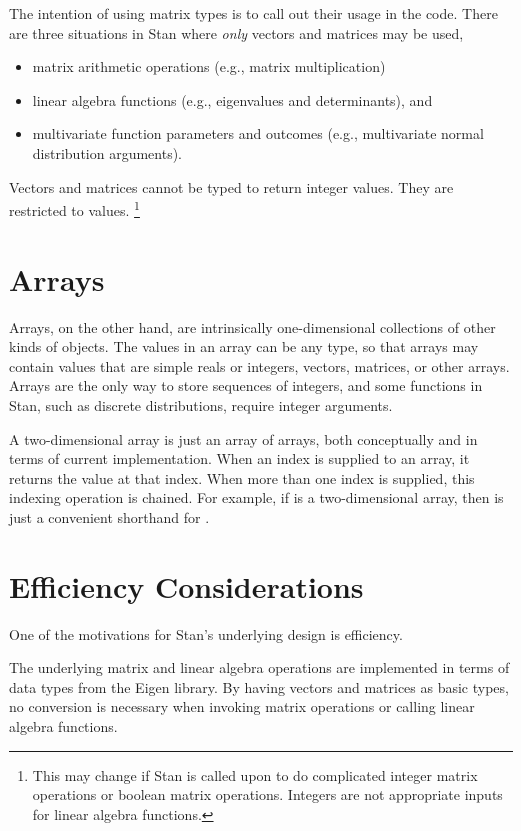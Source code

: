 The intention of using matrix types is to call out their usage in the
code.  There are three situations in Stan where {\it only} vectors and
matrices may be used,
%
\begin{itemize}
\item matrix arithmetic operations (e.g., matrix multiplication)
\item linear algebra functions (e.g., eigenvalues and determinants),
  and
\item multivariate function parameters and outcomes (e.g.,
  multivariate normal distribution arguments).
\end{itemize}
%

Vectors and matrices cannot be typed to return integer values.  They
are restricted to  values.%
%
\footnote{This may change if Stan is called upon to do complicated
  integer matrix operations or boolean matrix operations.  Integers
  are not appropriate inputs for linear algebra functions.}

\section{Arrays}

Arrays, on the other hand, are intrinsically one-dimensional
collections of other kinds of objects.  The values in an array can be
any type, so that arrays may contain values that are simple reals or
integers, vectors, matrices, or other arrays.  Arrays are the only way
to store sequences of integers, and some functions in Stan, such as
discrete distributions, require integer arguments. 


A two-dimensional array is just an array of arrays, both conceptually
and in terms of current implementation.  When an index is supplied to
an array, it returns the value at that index.  When more than one
index is supplied, this indexing operation is chained.  For example, if
 is a two-dimensional array, then  is just
a convenient shorthand for .


\section{Efficiency Considerations}

One of the motivations for Stan's underlying design is efficiency.

The underlying matrix and linear algebra operations are implemented in
terms of data types from the Eigen \Cpp library.  By having vectors
and matrices as basic types, no conversion is necessary when invoking
matrix operations or calling linear algebra functions.  

